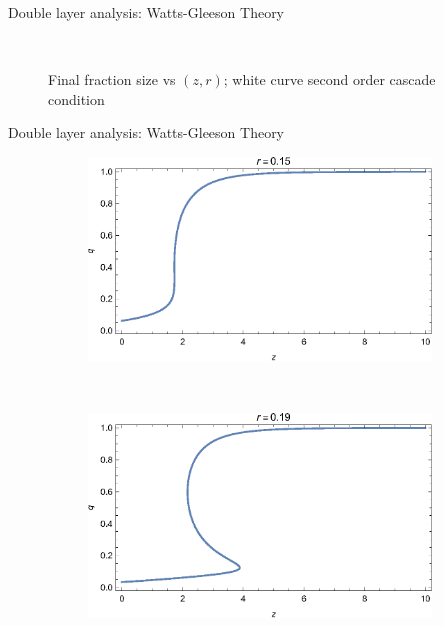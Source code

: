 \documentclass[10pt, xcolor=dvipsnames, handout]{beamer}
\begin{document}
\begin{frame}{Double layer analysis: Watts-Gleeson Theory}
\begin{figure}
\begin{subfigure}[b]{0.4\textwidth}
    \end{subfigure}
    ~ %
    \caption{Final fraction size vs $(z,r)$; white curve second order cascade condition}
\end{figure}

\end{frame}

\begin{frame}{Double layer analysis: Watts-Gleeson Theory}
\begin{figure}
    \centering
    \begin{subfigure}[b]{0.4\textwidth}
        \includegraphics[width=\textwidth]{figures/two_layer_edge_qz_r015}
    \end{subfigure}
    ~ %
    \begin{subfigure}[b]{0.4\textwidth}
        \includegraphics[width=\textwidth]{figures/two_layer_edge_qz_r019}

\end{subfigure}
\end{figure}
\end{frame}
\end{document}
